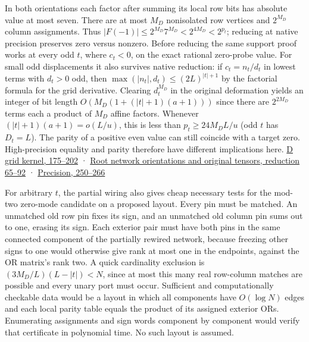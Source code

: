 \documentclass[
  11pt,
]{article}
\begin{document}
In both orientations each factor after summing its local row bits has
absolute value at most seven. There are at most \(M_D\) nonisolated row
vertices and \(2^{M_D}\) column assignments. Thus
\(|F(-1)|\le 2^{M_D}7^{M_D}<2^{4M_D}<2^{p_t}\); reducing at native
precision preserves zero versus nonzero. Before reducing the same
support proof works at every odd \(t\), where \(c_t<0\), on the exact
rational zero-probe value. For small odd displacements it also survives
native reduction: if \(c_t=n_t/d_t\) in lowest terms with \(d_t>0\) odd,
then \(\max(|n_t|,d_t)\le(2L)^{|t|+1}\) by the factorial formula for the
grid derivative. Clearing \(d_t^{M_D}\) in the original deformation
yields an integer of bit length \(O(M_D(1+(|t|+1)(a+1)))\) since there
are \(2^{2M_D}\) terms each a product of \(M_D\) affine factors.
Whenever \((|t|+1)(a+1)=o(L/u)\), this is less than \(p_t\ge 24M_D L/u\)
(odd \(t\) has \(D_t=L\)). The parity of a positive even value can still
coincide with a target zero. High-precision equality and parity
therefore have different implications here.
\href{https://github.com/openai/math/blob/main/preprints/The-Exponential-Time-Hypothesis-is-False-October-25-2026/build/quantitative-contraction.tex\#L175}{D
grid kernel, 175--202} ·
\href{https://github.com/openai/math/blob/main/preprints/The-Exponential-Time-Hypothesis-is-False-October-25-2026/build/quantitative-reduction.tex\#L65}{Root
network orientations and original tensors, reduction 65--92} ·
\href{https://github.com/openai/math/blob/main/preprints/The-Exponential-Time-Hypothesis-is-False-October-25-2026/build/quantitative-contraction.tex\#L250}{Precision,
250--266}

For arbitrary \(t\), the partial wiring also gives cheap necessary tests
for the mod-two zero-mode candidate on a proposed layout. Every pin must
be matched. An unmatched old row pin fixes its sign, and an unmatched
old column pin sums out to one, erasing its sign. Each exterior pair
must have both pins in the same connected component of the partially
rewired network, because freezing other signs to one would otherwise
give rank at most one in the endpoints, against the OR matrix's rank
two. A quick cardinality exclusion is \((3M_D/L)(L-|t|)<N\), since at
most this many real row-column matches are possible and every unary port
must occur. Sufficient and computationally checkable data would be a
layout in which all components have \(O(\log N)\) edges and each local
parity table equals the product of its assigned exterior ORs.
Enumerating assignments and sign words component by component would
verify that certificate in polynomial time. No such layout is assumed.
\end{document}
